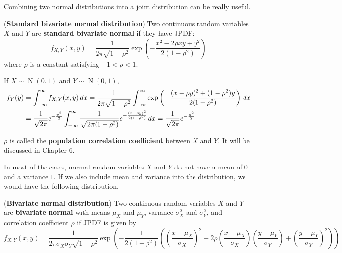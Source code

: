 \documentclass{huhtakm-template-book}
\DeclareMathOperator{\N}{N}
\begin{document}
\newpage
Combining two normal distributions into a joint distribution can be really useful.
\begin{eg}(\textbf{Standard bivariate normal distribution}) 
	Two continuous random variables $X$ and $Y$ are \textbf{standard bivariate normal} if they have JPDF:
	\begin{equation*}
		f_{X,Y}(x,y)=\frac{1}{2\pi\sqrt{1-\rho^{2}}}\exp\left(-\frac{x^{2}-2\rho xy+y^{2}}{2(1-\rho^{2})}\right)
	\end{equation*}
	where $\rho$ is a constant satisfying $-1<\rho<1$.
\end{eg}
\begin{rem}
	If $X\sim\N(0,1)$ and $Y\sim\N(0,1)$,
	\begin{align*}
		f_{Y}(y)&=\int_{-\infty}^{\infty} f_{X,Y}(x,y)\,dx=\frac{1}{2\pi\sqrt{1-\rho^{2}}}\int_{-\infty}^{\infty}\exp\left(-\frac{(x-\rho y)^{2}+(1-\rho^{2})y}{2(1-\rho^{2})}\right)\,dx\\
		&=\frac{1}{\sqrt{2\pi}}e^{-\frac{y^{2}}{2}}\int_{-\infty}^{\infty}\frac{1}{\sqrt{2\pi(1-\rho^{2})}}e^{-\frac{(x-\rho y)^{2}}{2(1-\rho^{2})}}\,dx=\frac{1}{\sqrt{2\pi}}e^{-\frac{y^{2}}{2}}
	\end{align*}
\end{rem}
\begin{rem}
	$\rho$ is called the \textbf{population correlation coefficient} between $X$ and $Y$. It will be discussed in Chapter 6.
\end{rem}
In most of the cases, normal random variables $X$ and $Y$ do not have a mean of $0$ and a variance $1$. If we also include mean and variance into the distribution, we would have the following distribution.
\begin{eg}(\textbf{Bivariate normal distribution})
	Two continuous random variables $X$ and $Y$ are \textbf{bivariate normal} with means $\mu_{X}$ and $\mu_{Y}$, variance $\sigma_{X}^{2}$ and $\sigma_{Y}^{2}$, and correlation coefficient $\rho$ if JPDF is given by
	\begin{equation*}
		f_{X,Y}(x,y)=\frac{1}{2\pi\sigma_{X}\sigma_{Y}\sqrt{1-\rho^{2}}}\exp\left(-\frac{1}{2(1-\rho^{2})}\left(\left(\frac{x-\mu_{X}}{\sigma_{X}}\right)^{2}-2\rho\left(\frac{x-\mu_{X}}{\sigma_{X}}\right)\left(\frac{y-\mu_{Y}}{\sigma_{Y}}\right)+\left(\frac{y-\mu_{Y}}{\sigma_{Y}}\right)^{2}\right)\right)
	\end{equation*}
\end{eg}
\end{document}
